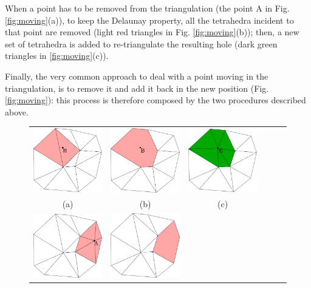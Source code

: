 When a point has to be removed from the triangulation (the point A in Fig. \ref{fig:moving}(a)), to keep the Delaunay property, all the tetrahedra incident to that point are removed (light red triangles in Fig. \ref{fig:moving}(b)); then,  a new set of tetrahedra is added to re-triangulate the resulting hole (dark green triangles in \ref{fig:moving}(c)).

Finally, the very common approach to deal with a point moving in the triangulation, is to remove it and add it back in the new position \cite{cgal} (Fig. \ref{fig:moving}): this process is therefore composed by the two procedures described above.

\begin{figure}[t]
\centering
\begin{tabular}{cccccc}
\includegraphics[width=0.25\columnwidth]{./img//delaunayExampleMoving04}&
\includegraphics[width=0.25\columnwidth]{./img//delaunayExampleMoving05}&
\includegraphics[width=0.25\columnwidth]{./img//delaunayExampleMoving06}\\
(a)&(b)&(c)\\
\includegraphics[width=0.25\columnwidth]{./img//delaunayExampleMoving01}&
\includegraphics[width=0.25\columnwidth]{./img//delaunayExampleMoving02}&

\end{tabular}
\end{figure}
